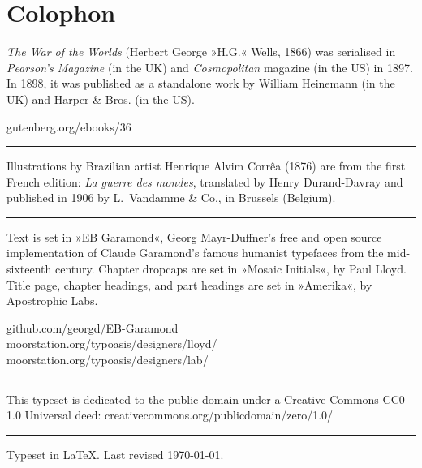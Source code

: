 \documentclass[
a5paper,
]{scrbook} %
\begin{document}
\chapter*{Colophon}
\centering
\vfill
\vfill
\begin{minipage}{\textwidth}
\textit{The War of the Worlds} (Herbert George »H.G.« Wells, 1866) was serialised in \textit{Pearson's Magazine} (in the UK) and \textit{Cosmopolitan} magazine (in the US) in 1897. In 1898, it was published as a standalone work by William Heinemann (in the UK) and Harper \& Bros. (in the US). 
\end{minipage}
\vfill
gutenberg.org/ebooks/36
\vfill
\rule{0.5\textwidth}{.4pt}
\vfill
\begin{minipage}{\textwidth}
Illustrations by Brazilian artist Henrique Alvim Corrêa (1876) are from the first French edition: \textit{La guerre des mondes}, translated by Henry Durand-Davray and published in 1906 by L.~Vandamme \& Co., in Brussels (Belgium).
\end{minipage}
\vfill
\rule{0.5\textwidth}{.4pt}
\vfill
\begin{minipage}{\textwidth}
Text is set in »EB Garamond«, Georg Mayr-Duffner's free and open source implementation of Claude Garamond’s famous humanist typefaces from the mid-sixteenth century.  Chapter dropcaps are set in »Mosaic Initials«, by Paul Lloyd. Title page, chapter headings, and part headings are set in »Amerika«, by Apostrophic Labs.
\end{minipage}
\vfill
github.com/georgd/EB-Garamond\\
moorstation.org/typoasis/designers/lloyd/\\
moorstation.org/typoasis/designers/lab/
\vfill
\rule{0.5\textwidth}{.4pt}
\vfill
\begin{minipage}{\textwidth}
This typeset is dedicated to the public domain under a Creative Commons CC0 1.0 Universal deed: creativecommons.org/publicdomain/zero/1.0/
\end{minipage}
\vfill
\rule{0.5\textwidth}{.4pt}
\vfill
Typeset in \LaTeX{}. Last revised \today.

\thispagestyle{empty}
\end{document}
